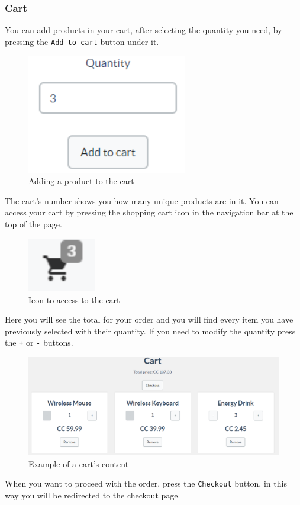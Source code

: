 		\subsubsection{Cart}
		You can add products in your cart, after selecting the quantity you 
		need, by pressing the \texttt{Add to cart} button under it.
		\begin{figure}[H]
			\includegraphics[width=7cm]{res/images/add_to_cart.png}
			\centering
			\caption{Adding a product to the cart}
		\end{figure}
		\noindent The cart's number shows you how many unique products 
		are in it. You can access your cart by pressing the shopping cart icon 
		in the navigation bar at the top of the page.
		\begin{figure}[H]
			\includegraphics[width=3cm]{res/images/cart_icon.png}
			\centering
			\caption{Icon to access to the cart}
		\end{figure}
		\noindent Here you will see the total for your order and you will find 
		every item you have previously selected with their quantity. If you 
		need to modify the quantity press the \texttt{+} or \texttt{-} buttons.
		\begin{figure}[H]
			\includegraphics[width=15cm]{res/images/cart_example.png}
			\centering
			\caption{Example of a cart's content}
		\end{figure}
		\noindent When you want to proceed with the order, press the \texttt{Checkout} 
		button, in this way you will be redirected to the checkout page.

